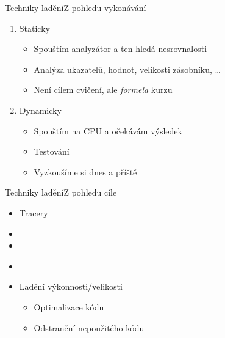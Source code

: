 
\begin{frame}{Techniky ladění}{Z pohledu vykonávání}

  \begin{enumerate}
    \item Staticky
    \begin{itemize}
      \item Spouštím analyzátor a ten hledá nesrovnalosti
      \item Analýza ukazatelů, hodnot, velikosti zásobníku, \dots
      \item Není cílem \iffimuni cvičení, ale
	\href{http://formela.fi.muni.cz/}{\emph{formela}} \else kurzu \fi
    \end{itemize}

    \pause

    \item Dynamicky
    \begin{itemize}
      \item Spouštím na CPU a očekávám výsledek
      \item Testování
      \item Vyzkoušíme si \iffimuni dnes a příště \fi
    \end{itemize}
  \end{enumerate}

\end{frame}

\begin{frame}{Techniky ladění}{Z pohledu cíle}

  \iffimuni
  \fi
  \begin{itemize}
    \item Tracery
    \item {}
    \item {}
  \end{itemize}

  \iffimuni
  \fi
  \begin{itemize}
    \item {}
    \item Ladění výkonnosti/velikosti
    \begin{itemize}
      \item Optimalizace kódu
      \item Odstranění nepoužitého kódu
    \end{itemize}
  \end{itemize}

\end{frame}

